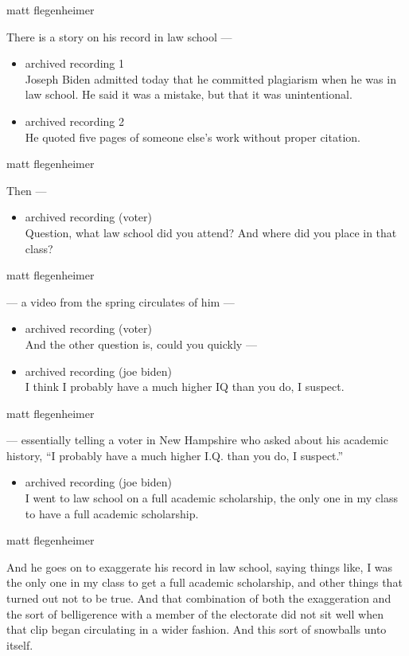 matt flegenheimer

There is a story on his record in law school ---

\begin{itemize}
\item
  archived recording 1\\
  Joseph Biden admitted today that he committed plagiarism when he was
  in law school. He said it was a mistake, but that it was
  unintentional.
\item
  archived recording 2\\
  He quoted five pages of someone else's work without proper citation.
\end{itemize}

matt flegenheimer

Then ---

\begin{itemize}
\tightlist
\item
  archived recording (voter)\\
  Question, what law school did you attend? And where did you place in
  that class?
\end{itemize}

matt flegenheimer

--- a video from the spring circulates of him ---

\begin{itemize}
\item
  archived recording (voter)\\
  And the other question is, could you quickly ---
\item
  archived recording (joe biden)\\
  I think I probably have a much higher IQ than you do, I suspect.
\end{itemize}

matt flegenheimer

--- essentially telling a voter in New Hampshire who asked about his
academic history, ``I probably have a much higher I.Q. than you do, I
suspect.''

\begin{itemize}
\tightlist
\item
  archived recording (joe biden)\\
  I went to law school on a full academic scholarship, the only one in
  my class to have a full academic scholarship.
\end{itemize}

matt flegenheimer

And he goes on to exaggerate his record in law school, saying things
like, I was the only one in my class to get a full academic scholarship,
and other things that turned out not to be true. And that combination of
both the exaggeration and the sort of belligerence with a member of the
electorate did not sit well when that clip began circulating in a wider
fashion. And this sort of snowballs unto itself.

